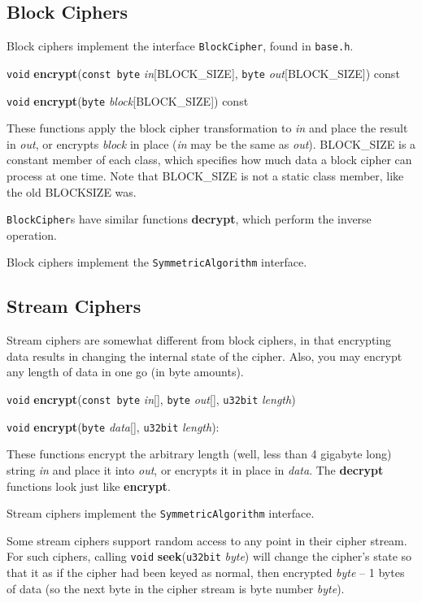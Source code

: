 \documentclass{article}
\newcommand{\filename}[1]{\texttt{#1}}
\newcommand{\function}[1]{\textbf{#1}}
\newcommand{\type}[1]{\texttt{#1}}
\renewcommand{\arg}[1]{\textsl{#1}}
\begin{document}
\subsection{Block Ciphers}

Block ciphers implement the interface \type{BlockCipher}, found in
\filename{base.h}.

\noindent
\type{void} \function{encrypt}(\type{const byte} \arg{in}[BLOCK\_SIZE],
                               \type{byte} \arg{out}[BLOCK\_SIZE]) const

\noindent
\type{void} \function{encrypt}(\type{byte} \arg{block}[BLOCK\_SIZE]) const

These functions apply the block cipher transformation to \arg{in} and place the
result in \arg{out}, or encrypts \arg{block} in place (\arg{in} may be the same
as \arg{out}). BLOCK\_SIZE is a constant member of each class, which specifies
how much data a block cipher can process at one time. Note that BLOCK\_SIZE is
not a static class member, like the old BLOCKSIZE was.

\type{BlockCipher}s have similar functions \function{decrypt}, which perform
the inverse operation.

Block ciphers implement the \type{SymmetricAlgorithm} interface.

\subsection{Stream Ciphers}

Stream ciphers are somewhat different from block ciphers, in that encrypting
data results in changing the internal state of the cipher. Also, you may
encrypt any length of data in one go (in byte amounts).

\noindent
\type{void} \function{encrypt}(\type{const byte} \arg{in}[], \type{byte}
\arg{out}[], \type{u32bit} \arg{length})

\noindent
\type{void} \function{encrypt}(\type{byte} \arg{data}[], \type{u32bit}
\arg{length}):

These functions encrypt the arbitrary length (well, less than 4 gigabyte long)
string \arg{in} and place it into \arg{out}, or encrypts it in place in
\arg{data}. The \function{decrypt} functions look just like
\function{encrypt}.

Stream ciphers implement the \type{SymmetricAlgorithm} interface.

Some stream ciphers support random access to any point in their cipher
stream. For such ciphers, calling \type{void} \function{seek}(\type{u32bit}
\arg{byte}) will change the cipher's state so that it as if the cipher had been
keyed as normal, then encrypted \arg{byte} -- 1 bytes of data (so the next byte
in the cipher stream is byte number \arg{byte}).
\end{document}
